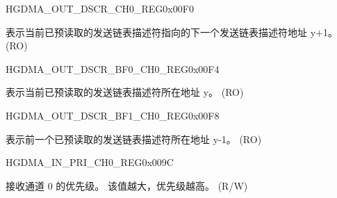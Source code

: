 \begin{register}{H}{GDMA\_OUT\_DSCR\_CH0\_REG}{0x00F0}\label{regdesc:GDMAOUTDSCRCH0REG}
%
\regnewline%
\begin{regdesc}\begin{reglist}
\label{fielddesc:GDMAOUTLINKDSCRCH0}\item [GDMA\_OUTLINK\_DSCR\_CH0] 表示当前已预读取的发送链表描述符指向的下一个发送链表描述符地址 y+1。 (RO)
\end{reglist}\end{regdesc}
\end{register}


\begin{register}{H}{GDMA\_OUT\_DSCR\_BF0\_CH0\_REG}{0x00F4}\label{regdesc:GDMAOUTDSCRBF0CH0REG}
%
\regnewline%
\begin{regdesc}\begin{reglist}
\label{fielddesc:GDMAOUTLINKDSCRBF0CH0}\item [GDMA\_OUTLINK\_DSCR\_BF0\_CH0] 表示当前已预读取的发送链表描述符所在地址 y。 (RO)
\end{reglist}\end{regdesc}
\end{register}


\begin{register}{H}{GDMA\_OUT\_DSCR\_BF1\_CH0\_REG}{0x00F8}\label{regdesc:GDMAOUTDSCRBF1CH0REG}
%
\regnewline%
\begin{regdesc}\begin{reglist}
\label{fielddesc:GDMAOUTLINKDSCRBF1CH0}\item [GDMA\_OUTLINK\_DSCR\_BF1\_CH0] 表示前一个已预读取的发送链表描述符所在地址 y-1。 (RO)
\end{reglist}\end{regdesc}
\end{register}


\begin{register}{H}{GDMA\_IN\_PRI\_CH0\_REG}{0x009C}\label{regdesc:GDMAINPRICH0REG}
%
%
\regnewline%
\begin{regdesc}\begin{reglist}
\label{fielddesc:GDMARXPRICH0}\item [GDMA\_RX\_PRI\_CH0] 接收通道 0 的优先级。 该值越大，优先级越高。 (R/W)
\end{reglist}\end{regdesc}
\end{register}


